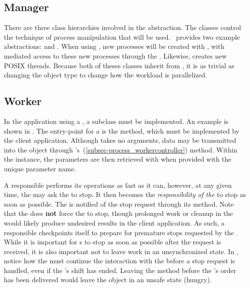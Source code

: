 \subsection{Manager}
\label{subsec-process_manager}

There are three class hierarchies involved in the abstraction.  
The  classes control the
technique of process manipulation that will be used.  \sname\ provides two
example abstractions:  and
.  When
using , new processes will be created with 
, with mediated access to these new processes through the
.  Likewise, 
creates new POSIX threads.  Because both of theses classes inherit from
, it is as trivial as changing the  object type
to change how the workload is parallelized.

\subsection{Worker}
\label{subsec-process_worker}

In the application using a , a  subclass must be
implemented.  An example  is shown in
.
The entry-point for a  is the 
method, which must be implemented by the client application.  Although
 takes no arguments, data may be transmitted
into the object through
's~(\ref{subsec-process_workercontroller})
 method.  Within the  instance,
the parameters are then retrieved with  when
provided with the unique parameter name.

A responsible  performs its operations as fast as it can,
however, at any given time, the  may ask the  to
stop.  It then becomes the {\em responsibility of the } to 
stop as soon as possible.  The  is notified of the stop request
through its  method.  Note that the
 does \textbf{not} force the  to stop, though
prolonged work or cleanup in the  would likely produce
undesired results in the client application.  As such, a responsible
 checkpoints itself to prepare for premature stops requested by
the .  While it is important for s to stop as soon
as possible after the request is received, it is also important not to leave
work in an unsynchronized state.  In ,
notice how
the  must continue the interaction with the 
before a stop request is handled, even if the 's shift has
ended.  Leaving the method before the 's order has been
delivered would leave the  object in an unsafe state (hungry). 

